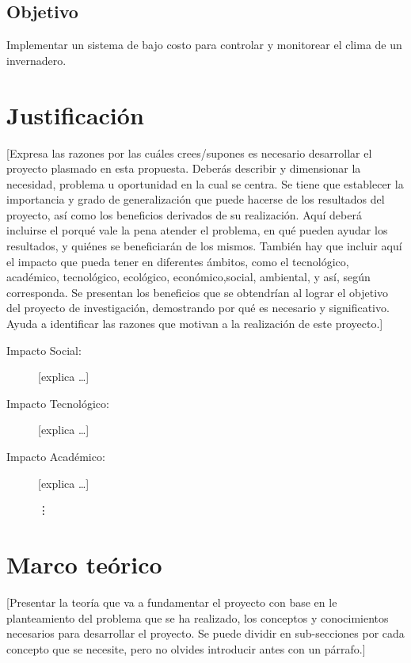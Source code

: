 \documentclass[final,12pt]{article}
\begin{document}
\subsection{Objetivo}

Implementar un sistema de bajo costo para controlar y monitorear el clima de un invernadero.

\section{Justificación}

[Expresa las razones por las cuáles crees/supones es necesario desarrollar el proyecto plasmado en esta propuesta. 
Deberás describir y dimensionar la necesidad, problema u oportunidad en la cual se centra. 
Se tiene que establecer la importancia y grado de generalización que puede hacerse de los resultados del proyecto, así como los beneficios derivados de su realización. 
Aquí deberá incluirse el porqué vale la pena atender el problema, en qué pueden ayudar los resultados, y quiénes se beneficiarán de los mismos. También hay que incluir aquí el impacto que pueda tener en diferentes ámbitos, como el  tecnológico, académico, tecnológico, ecológico, económico,social, ambiental, y así, según corresponda. 
Se presentan los beneficios que se obtendrían al lograr el objetivo del proyecto de investigación, demostrando por qué es necesario y significativo. 
Ayuda a identificar las razones que motivan a la realización de este proyecto.]
\begin{description}
\item [Impacto Social:] [explica
\dots]


\item [Impacto Tecnológico:]
[explica
\dots]

\item [Impacto Académico:] 
[explica \dots]

\vdots


\end{description}


\section{Marco teórico}

[Presentar la teoría que va a fundamentar el proyecto con base en le planteamiento del problema que se ha realizado, los conceptos y conocimientos necesarios para desarrollar el proyecto. Se puede dividir en sub-secciones por cada concepto que se necesite, pero no olvides introducir antes con un párrafo.]
\end{document}

